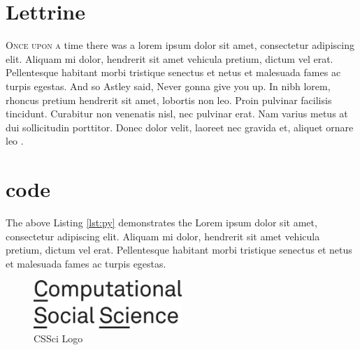 \section{Lettrine}
\lettrine{O}{\fontsize{14}\fscshape{}\selectfont{}nce upon a} time there was a lorem ipsum dolor sit amet, consectetur adipiscing elit. Aliquam mi dolor, hendrerit sit amet vehicula pretium, dictum vel erat. Pellentesque habitant morbi tristique senectus et netus et malesuada fames ac turpis egestas. And so Astley \citeyear{astley1987never} said, Never gonna give you up. In nibh lorem, rhoncus pretium hendrerit sit amet, lobortis non leo. Proin pulvinar facilisis tincidunt. Curabitur non venenatis nisl, nec pulvinar erat. Nam varius metus at dui sollicitudin porttitor. Donec dolor velit, laoreet nec gravida et, aliquet ornare leo \cite{astley1987never}. 


\section{code}



The above Listing \ref{lst:py} demonstrates the Lorem ipsum dolor sit amet, consectetur adipiscing elit. Aliquam mi dolor, hendrerit sit amet vehicula pretium, dictum vel erat. Pellentesque habitant morbi tristique senectus et netus et malesuada fames ac turpis egestas.


\begin{figure}[h]
\centering
\includegraphics[width=0.5\textwidth]{images/csscilogo.png}
\caption{CSSci Logo \cite{csci2022uva}}
\label{fig:logo-cssci}
\end{figure}